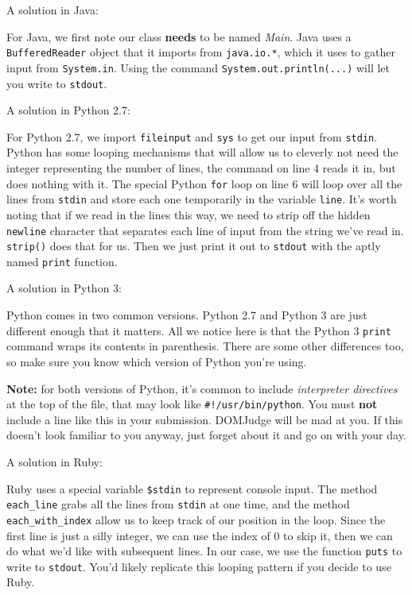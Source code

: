 \documentclass[a4paper]{article}
\begin{document}
\newpage

A solution in Java:


For Java, we first note our class \textbf{needs} to be named \textit{Main}. Java uses a \texttt{BufferedReader} object that it imports from \texttt{java.io.*}, which it uses to gather input from \texttt{System.in}. Using the command \texttt{System.out.println(...)} will let you write to \texttt{stdout}.

A solution in Python 2.7:


For Python 2.7, we import \texttt{fileinput} and \texttt{sys} to get our input from \texttt{stdin}. Python has some looping mechanisms that will allow us to cleverly not need the integer representing the number of lines, the command on line 4 reads it in, but does nothing with it. The special Python \texttt{for} loop on line 6 will loop over all the lines from \texttt{stdin} and store each one temporarily in the variable \texttt{line}. It's worth noting that if we read in the lines this way, we need to strip off the hidden \texttt{newline} character that separates each line of input from the string we've read in. \texttt{strip()} does that for us. Then we just print it out to \texttt{stdout} with the aptly named \texttt{print} function.

A solution in Python 3:


Python comes in two common versions. Python 2.7 and Python 3 are just different enough that it matters. All we notice here is that the Python 3 \texttt{print} command wraps its contents in parenthesis. There are some other differences too, so make sure you know which version of Python you're using. 

\textbf{Note:} for both versions of Python, it's common to include \textit{interpreter directives} at the top of the file, that may look like \texttt{\#!/usr/bin/python}. You must \textbf{not} include a line like this in your submission. DOMJudge will be mad at you. If this doesn't look familiar to you anyway, just forget about it and go on with your day. 
\newpage

A solution in Ruby:


Ruby uses a special variable \texttt{\$stdin} to represent console input. The method \texttt{each\_line} grabs all the lines from \texttt{stdin} at one time, and the method \texttt{each\_with\_index} allow us to keep track of our position in the loop. Since the first line is just a silly integer, we can use the index of 0 to skip it, then we can do what we'd like with subsequent lines. In our case, we use the function \texttt{puts} to write to \texttt{stdout}. You'd likely replicate this looping pattern if you decide to use Ruby.
\end{document}
